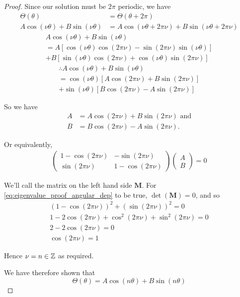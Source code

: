 \begin{proof}
  Since our solution must be $2\pi$ periodic, we have
  \begin{align*}
    \Theta(\theta) &= \Theta(\theta+2 \pi)\\
    A \cos(\nu\theta) + B \sin(\nu \theta) &= A \cos(\nu\theta+2\pi\nu) + B \sin(\nu \theta + 2 \pi \nu)
  \end{align*}
  \begin{multline*}
      A \cos(\nu\theta) + B \sin(\nu \theta) \\
      = A [\cos(\nu\theta)\cos(2\pi\nu) - \sin(2\pi\nu)\sin(\nu\theta)] \\
      + B [\sin(\nu\theta)\cos(2\pi\nu) + \cos(\nu\theta)\sin(2\pi\nu)]
  \end{multline*}
  \begin{multline*}
      \therefore A\cos(\nu\theta) + B \sin(\nu \theta) \\
      = \cos(\nu\theta)[A\cos(2\pi\nu) + B\sin(2\pi\nu)] \\
      + \sin(\nu\theta)[B\cos(2\pi\nu) - A\sin(2\pi\nu)]
  \end{multline*}\par
  So we have
  \begin{align*}
    A &= A\cos(2\pi\nu) + B\sin(2\pi\nu) \text{ and}\\
    B &= B\cos(2\pi\nu) - A\sin(2\pi\nu).
  \end{align*}\par
  Or equivalently,
  \begin{align}\label{eq:eigenvalue_proof_angular_dep}
    \begin{pmatrix}
      1 - \cos(2\pi\nu) & -\sin(2\pi\nu)\\
      \sin(2\pi\nu) & 1 - \cos(2\pi\nu)
    \end{pmatrix}
    \begin{pmatrix}
      A\\
      B
    \end{pmatrix}
    = 0
  \end{align}\par
  We'll call the matrix on the left hand side $\mathbf{M}$. For \eqref{eq:eigenvalue_proof_angular_dep} to be true, $\det(\mathbf{M}) = 0$, and so
  \begin{gather*}
    (1 - \cos(2\pi\nu))^2 + (\sin(2\pi\nu))^2 = 0 \\
    1 - 2\cos(2\pi\nu) + \cos^2(2\pi\nu) + \sin^2(2\pi\nu) = 0 \\
    2 - 2\cos(2\pi\nu) = 0 \\
    \cos(2\pi\nu) = 1
  \end{gather*}\par
  Hence $\nu = n \in \mathbb{Z}$ as required. \par
  We have therefore shown that
  \begin{equation*}
    \Theta(\theta) = A \cos(n\theta) + B \sin(n \theta)
  \end{equation*}
\end{proof}

